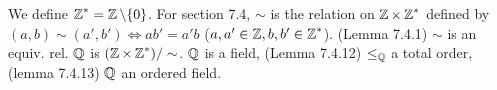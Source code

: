  We define $\Z^* = \Z \setminus \{ 0 \}$. For section 7.4, $\sim$ is the relation on $\Z \times \Z^*$ defined by $(a, b) \sim (a', b') \iff ab' = a'b$ ($a, a' \in \Z, b, b' \in \Z^*$). (Lemma 7.4.1) $\sim$ is an equiv. rel.
 $\Q$ is $(\Z \times \Z^*) / \sim$.
 $\Q$ is a field, (Lemma 7.4.12) $\leq_{\Q}$ a total order, (lemma 7.4.13) $\Q$ an ordered field.

